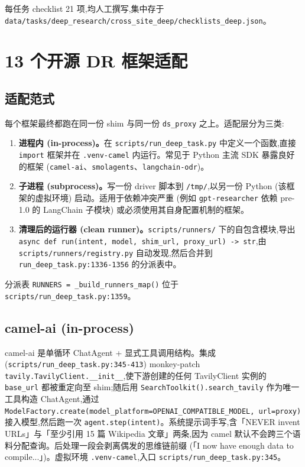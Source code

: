 \documentclass[UTF8,a4paper,12pt,oneside]{ctexart}
\begin{document}
每任务 checklist 21 项,均人工撰写,集中存于 \texttt{data/tasks/deep\_research/cross\_site\_deep/checklists\_deep.json}。

\section{13 个开源 DR 框架适配}

\subsection{适配范式}

每个框架最终都跑在同一份 shim 与同一份 \texttt{ds\_proxy} 之上。适配层分为三类:

\begin{enumerate}[leftmargin=2em]
\item \textbf{进程内 (in-process)。}在 \texttt{scripts/run\_deep\_task.py} 中定义一个函数,直接 \texttt{import} 框架并在 \texttt{.venv-camel} 内运行。常见于 Python 主流 SDK 暴露良好的框架 (\texttt{camel-ai}、\texttt{smolagents}、\texttt{langchain-odr})。
\item \textbf{子进程 (subprocess)。}写一份 driver 脚本到 \texttt{/tmp/},以另一份 Python (该框架的虚拟环境) 启动。适用于依赖冲突严重 (例如 \texttt{gpt-researcher} 依赖 pre-1.0 的 LangChain 子模块) 或必须使用其自身配置机制的框架。
\item \textbf{清理后的运行器 (clean runner)。}\texttt{scripts/runners/} 下的自包含模块,导出 \texttt{async def run(intent, model, shim\_url, proxy\_url) -> str},由 \texttt{scripts/runners/registry.py} 自动发现,然后合并到 \texttt{run\_deep\_task.py:1336-1356} 的分派表中。
\end{enumerate}

分派表 \texttt{RUNNERS = \_build\_runners\_map()} 位于 \texttt{scripts/run\_deep\_task.py:1359}。

\subsection{camel-ai (in-process)}

camel-ai 是单循环 ChatAgent + 显式工具调用结构。集成 (\texttt{scripts/run\_deep\_task.py:345-413}) monkey-patch \texttt{tavily.TavilyClient.\_\_init\_\_},使下游创建的任何 TavilyClient 实例的 \texttt{base\_url} 都被重定向至 shim;随后用 \texttt{SearchToolkit().search\_tavily} 作为唯一工具构造 ChatAgent,通过 \texttt{ModelFactory.create(model\_platform=OPENAI\_COMPATIBLE\_MODEL, url=proxy)} 接入模型,然后跑一次 \texttt{agent.step(intent)}。系统提示词手写,含「NEVER invent URLs」与「至少引用 15 篇 Wikipedia 文章」两条,因为 camel 默认不会跨三个语料分配查询。后处理一段会剥离偶发的思维链前缀 (「I now have enough data to compile...」)。虚拟环境 \texttt{.venv-camel},入口 \texttt{scripts/run\_deep\_task.py:345}。
\end{document}
